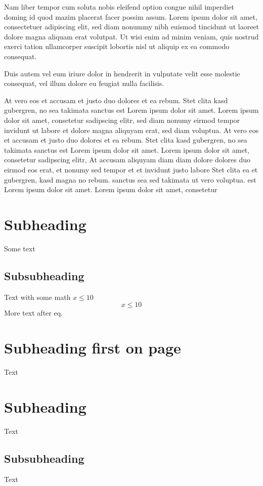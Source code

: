 \documentclass[
	ngerman,
	ruledheaders=section,%
	class=report,%
	thesis={type=bachelor},%
	accentcolor=9c,%
	custommargins=true,%
	marginpar=false,%
	parskip=half-,%
	fontsize=11pt,%
]{tudapub}
\begin{document}
Nam liber tempor cum soluta nobis eleifend option congue nihil imperdiet doming id quod mazim placerat facer possim assum. Lorem ipsum dolor sit amet, consectetuer adipiscing elit, sed diam nonummy nibh euismod tincidunt ut laoreet dolore magna aliquam erat volutpat. Ut wisi enim ad minim veniam, quis nostrud exerci tation ullamcorper suscipit lobortis nisl ut aliquip ex ea commodo consequat.   

Duis autem vel eum iriure dolor in hendrerit in vulputate velit esse molestie consequat, vel illum dolore eu feugiat nulla facilisis.   

At vero eos et accusam et justo duo dolores et ea rebum. Stet clita kasd gubergren, no sea takimata sanctus est Lorem ipsum dolor sit amet. Lorem ipsum dolor sit amet, consetetur sadipscing elitr, sed diam nonumy eirmod tempor invidunt ut labore et dolore magna aliquyam erat, sed diam voluptua. At vero eos et accusam et justo duo dolores et ea rebum. Stet clita kasd gubergren, no sea takimata sanctus est Lorem ipsum dolor sit amet. Lorem ipsum dolor sit amet, consetetur sadipscing elitr, At accusam aliquyam diam diam dolore dolores duo eirmod eos erat, et nonumy sed tempor et et invidunt justo labore Stet clita ea et gubergren, kasd magna no rebum. sanctus sea sed takimata ut vero voluptua. est Lorem ipsum dolor sit amet. Lorem ipsum dolor sit amet, consetetur

\section{Subheading} 
Some text

\subsection{Subsubheading}
Text with some math $x \leq 10$
\begin{equation}
x \leq 10
\end{equation}
More text after eq.


\newpage
\section{Subheading first on page} 
Text
\section{Subheading} 
Text
\subsection{Subsubheading}
Text
\end{document}
